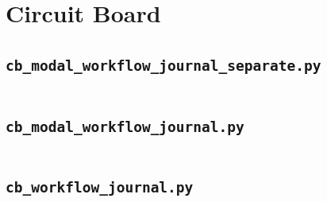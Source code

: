 \documentclass[12pt,report,justified]{SANDreport}
\begin{document}
\section{Circuit Board}

\subsection{\tt{cb\_modal\_workflow\_journal\_separate.py}}
\inputminted[stripnl=false]{python}{circuit_board/cb_modal_workflow_journal_separate.py}

\subsection{\tt{cb\_modal\_workflow\_journal.py}}
\inputminted[stripnl=false]{python}{circuit_board/cb_modal_workflow_journal.py}

\subsection{\tt{cb\_workflow\_journal.py}}
\inputminted[stripnl=false]{python}{circuit_board/cb_workflow_journal.py}

\end{document}
